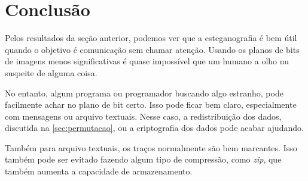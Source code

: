 \section{Conclusão}

Pelos resultados da seção anterior, podemos ver que a esteganografia é bem útil quando o objetivo é comunicação sem chamar atenção. Usando os planos de bits de imagens menos significativas é quase impossível que um humano a olho nu suspeite de alguma coisa.

No entanto, algum programa ou programador buscando algo estranho, pode facilmente achar no plano de bit certo. Isso pode ficar bem claro, especialmente com mensagens ou arquivo textuais. Nesse caso, a redistribuição dos dados, discutida na \cref{sec:permutacao}, ou a criptografia dos dados pode acabar ajudando.

Também para arquivo textuais, os traços normalmente são bem marcantes. Isso também pode ser evitado fazendo algum tipo de compressão, como \textit{zip}, que também aumenta a capacidade de armazenamento.
